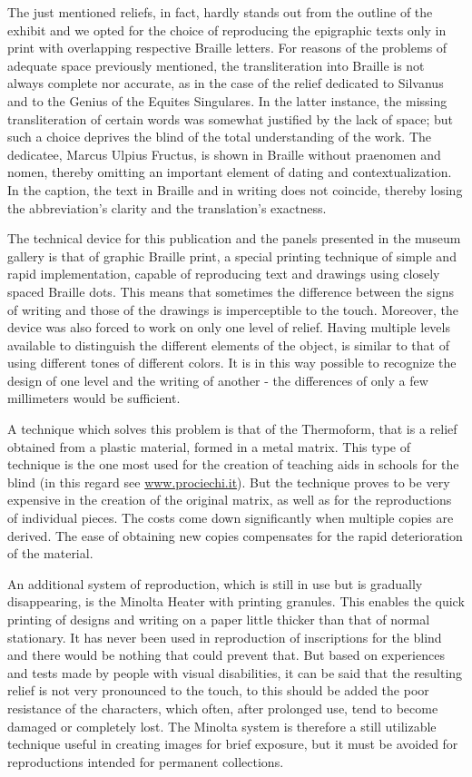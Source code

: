 \documentclass[amsthm,ebook]{saparticle}
\begin{document}
The just mentioned reliefs, in fact, hardly stands out from the outline of the exhibit and we opted for the choice of
reproducing the epigraphic texts only in print with overlapping respective Braille letters. For reasons of the problems
of adequate space previously mentioned, the transliteration into Braille is not always complete nor accurate, as in the
case of the relief dedicated to Silvanus and to the Genius of the Equites Singulares. In the latter instance, the
missing transliteration of certain words was somewhat justified by the lack of space; but such a choice deprives the
blind of the total understanding of the work. The dedicatee, Marcus Ulpius Fructus, is shown in Braille without
praenomen and nomen, thereby omitting an important element of dating and contextualization. In the caption, the text in
Braille and in writing does not coincide, thereby losing the abbreviation’s clarity and the translation’s exactness.

The technical device for this publication and the panels presented in the museum gallery is that of graphic Braille
print, a special printing technique of simple and rapid implementation, capable of reproducing text and drawings using
closely spaced Braille dots. This means that sometimes the difference between the signs of writing and those of the
drawings is imperceptible to the touch. Moreover, the device was also forced to work on only one level of relief.
Having multiple levels available to distinguish the different elements of the object, is similar to that of using
different tones of different colors. It is in this way possible to recognize the design of one level and the writing of
another - the differences of only a few millimeters would be sufficient.

A technique which solves this problem is that of the Thermoform, that is a relief obtained from a plastic material,
formed in a metal matrix. This type of technique is the one most used for the creation of teaching aids in schools for
the blind (in this regard see \url{www.prociechi.it}). But the technique proves to be very expensive in the creation of the
original matrix, as well as for the reproductions of individual pieces. The costs come down significantly when multiple
copies are derived. The ease of obtaining new copies compensates for the rapid deterioration of the material.

An additional system of reproduction, which is still in use but is gradually disappearing, is the Minolta Heater with
printing granules. This enables the quick printing of designs and writing on a paper little thicker than that of normal
stationary. It has never been used in reproduction of inscriptions for the blind and there would be nothing that could
prevent that. But based on experiences and tests made by people with visual disabilities, it can be said that the
resulting relief is not very pronounced to the touch, to this should be added the poor resistance of the characters,
which often, after prolonged use, tend to become damaged or completely lost. The Minolta system is therefore a still
utilizable technique useful in creating images for brief exposure, but it must be avoided for reproductions intended
for permanent collections.
\end{document}

